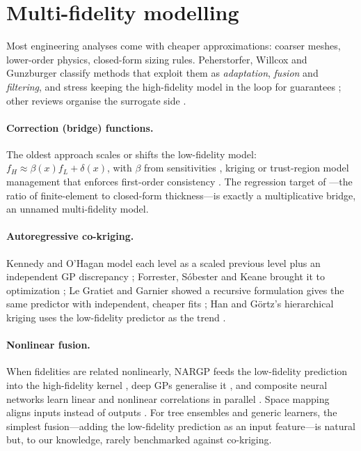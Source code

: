 \section{Multi-fidelity modelling}
\label{sec:mf}

Most engineering analyses come with cheaper approximations: coarser meshes, lower-order physics, closed-form sizing
rules. Peherstorfer, Willcox and Gunzburger classify methods that exploit them as \emph{adaptation}, \emph{fusion} and
\emph{filtering}, and stress keeping the high-fidelity model in the loop for guarantees
\cite{peherstorfer2018survey,peherstorfer2016optimal}; other reviews organise the surrogate side
\cite{fernandezgodino2016review,brevault2020overview}.

\paragraph{Correction (bridge) functions.} The oldest approach scales or shifts the low-fidelity model:
$f_H\approx\beta(x)f_L+\delta(x)$, with $\beta$ from sensitivities \cite{chang1993sensitivity}, kriging
\cite{gano2005hybrid} or trust-region model management that enforces first-order consistency
\cite{alexandrov1998trust,alexandrov2001approximation}. The regression target of \cite[Sec.~14.3, App.~G]{poznanski2026towards}---the ratio of finite-element to
closed-form thickness---is exactly a multiplicative bridge, an unnamed multi-fidelity model.

\paragraph{Autoregressive co-kriging.} Kennedy and O'Hagan model each level as a scaled previous level plus an independent
GP discrepancy \cite{kennedy2000predicting}; Forrester, S\'obester and Keane brought it to optimization
\cite{forrester2007multi}; Le Gratiet and Garnier showed a recursive formulation gives the same predictor with
independent, cheaper fits \cite{legratiet2014recursive}; Han and G\"ortz's hierarchical kriging uses the low-fidelity
predictor as the trend \cite{han2012hierarchical}.

\paragraph{Nonlinear fusion.} When fidelities are related nonlinearly, NARGP feeds the low-fidelity prediction into the
high-fidelity kernel \cite{perdikaris2017nonlinear}, deep GPs generalise it \cite{cutajar2019deep}, and composite neural
networks learn linear and nonlinear correlations in parallel \cite{meng2020composite}. Space mapping aligns inputs instead
of outputs \cite{bandler1994space,koziel2008space}. For tree ensembles and generic learners, the simplest fusion---adding
the low-fidelity prediction as an input feature---is natural but, to our knowledge, rarely benchmarked against
co-kriging.

